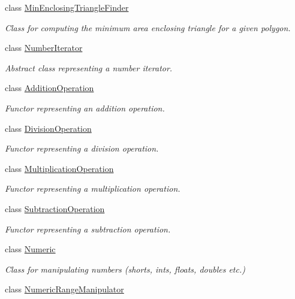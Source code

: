 \begin{DoxyCompactItemize}
class \hyperlink{classmultiscale_1_1MinEnclosingTriangleFinder}{\-Min\-Enclosing\-Triangle\-Finder}
\begin{DoxyCompactList}\small\item\em \-Class for computing the minimum area enclosing triangle for a given polygon. \end{DoxyCompactList}\item 
class \hyperlink{classmultiscale_1_1NumberIterator}{\-Number\-Iterator}
\begin{DoxyCompactList}\small\item\em \-Abstract class representing a number iterator. \end{DoxyCompactList}\item 
class \hyperlink{classmultiscale_1_1AdditionOperation}{\-Addition\-Operation}
\begin{DoxyCompactList}\small\item\em \-Functor representing an addition operation. \end{DoxyCompactList}\item 
class \hyperlink{classmultiscale_1_1DivisionOperation}{\-Division\-Operation}
\begin{DoxyCompactList}\small\item\em \-Functor representing a division operation. \end{DoxyCompactList}\item 
class \hyperlink{classmultiscale_1_1MultiplicationOperation}{\-Multiplication\-Operation}
\begin{DoxyCompactList}\small\item\em \-Functor representing a multiplication operation. \end{DoxyCompactList}\item 
class \hyperlink{classmultiscale_1_1SubtractionOperation}{\-Subtraction\-Operation}
\begin{DoxyCompactList}\small\item\em \-Functor representing a subtraction operation. \end{DoxyCompactList}\item 
class \hyperlink{classmultiscale_1_1Numeric}{\-Numeric}
\begin{DoxyCompactList}\small\item\em \-Class for manipulating numbers (shorts, ints, floats, doubles etc.) \end{DoxyCompactList}\item 
class \hyperlink{classmultiscale_1_1NumericRangeManipulator}{\-Numeric\-Range\-Manipulator}

\end{DoxyCompactItemize}
